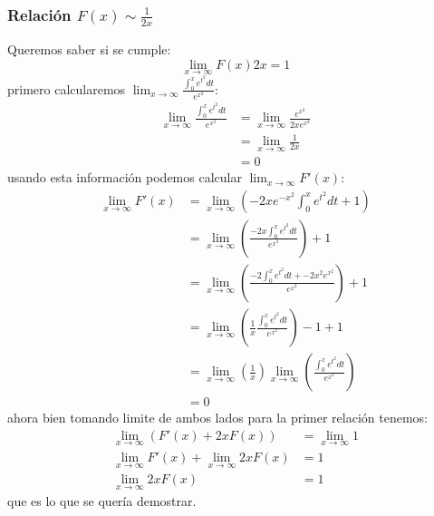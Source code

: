 \documentclass{article}
\begin{document}
\begin{tcolorbox}[breakable]
    \subsubsection*{Relación $F(x)\sim \frac{1}{2x}$}
    Queremos saber si se cumple:
    \[ \lim_{x\to \infty} F(x)2x = 1 \]
    primero calcularemos $\lim_{x \to \infty} \frac{\int_0^x e^{t^2}dt}{e^{x^2}}$:
    \begin{align*}
        \lim_{x \to \infty} \frac{\int_0^x e^{t^2}dt}{e^{x^2}}
        &= \lim_{x \to \infty} \frac{e^{x^2}}{2xe^{x^2}} \\
        &= \lim_{x \to \infty} \frac{1}{2x} \\
        &= 0
    \end{align*}
    usando esta información podemos calcular $\lim_{x \to \infty} F'(x)$:
    \begin{align*}
        \lim_{x \to \infty} F'(x) 
        &= \lim_{x \to \infty}\left(-2xe^{-x^2}\int_{0}^x e^{t^2}dt + 1\right) \\
        &= \lim_{x \to \infty}\left(\frac{-2x\int_0^x e^{t^2}dt }{e^{x^2}} \right) + 1 \\
        &= \lim_{x \to \infty}\left(\frac{-2\int_0^x e^{t^2}dt + -2x^2e^{x^2}}{e^{x^2}} \right) + 1 \\
        &= \lim_{x \to \infty}\left(\frac{1}{x}\frac{\int_0^x e^{t^2}dt}{e^{x^2}} \right) - 1 + 1 \\
        &= \lim_{x \to \infty}\left( \frac{1}{x} \right) \lim_{x \to \infty} \left(\frac{\int_0^xe^{t^2}dt}{e^{x^2}} \right) \\
        &= 0
    \end{align*}
    ahora bien tomando limite de ambos lados para la primer relación tenemos:
    \begin{align*}
        \lim_{x \to \infty}(F'(x) + 2xF(x)) &= \lim_{x \to \infty} 1 \\
        \lim_{x \to \infty}F'(x) + \lim_{x \to \infty} 2xF(x) &= 1 \\
        \lim_{x \to \infty} 2xF(x) &= 1
    \end{align*}
    que es lo que se quería demostrar. 


\end{tcolorbox}
\end{document}
